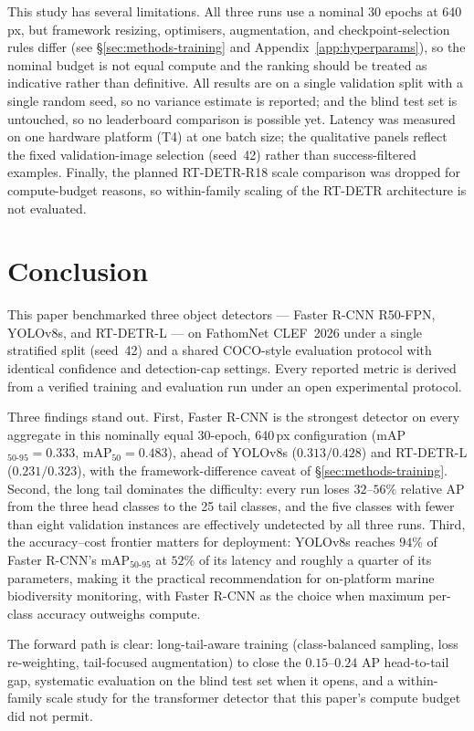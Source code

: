 \documentclass[11pt,a4paper,twocolumn]{article}
\begin{document}
This study has several limitations. All three runs use a nominal 30 epochs at 640\,px, but framework resizing, optimisers, augmentation, and checkpoint-selection rules differ (see \S\ref{sec:methods-training} and Appendix~\ref{app:hyperparams}), so the nominal budget is not equal compute and the ranking should be treated as indicative rather than definitive. All results are on a
single validation split with a single random seed, so no variance
estimate is reported; and the blind test set is untouched, so no
leaderboard comparison is possible yet. Latency was measured on one hardware platform (T4) at one batch size; the qualitative panels reflect the fixed validation-image selection (seed~42) rather than success-filtered examples. Finally, the
planned RT-DETR-R18 scale comparison was dropped for compute-budget
reasons, so within-family scaling of the RT-DETR architecture is not
evaluated.

\section{Conclusion}
\label{sec:conclusion}

This paper benchmarked three object detectors --- Faster R-CNN R50-FPN,
YOLOv8s, and RT-DETR-L --- on FathomNet CLEF~2026 under a single
stratified split (seed~42) and a shared COCO-style evaluation protocol
with identical confidence and detection-cap settings. Every reported
metric is derived from a verified training and evaluation run under an
open experimental protocol.

Three findings stand out. First, Faster R-CNN is the strongest detector on every aggregate in this nominally equal 30-epoch, 640\,px configuration (mAP$_{50\text{-}95}=0.333$, mAP$_{50}=0.483$), ahead of YOLOv8s ($0.313/0.428$) and RT-DETR-L ($0.231/0.323$), with the framework-difference caveat of \S\ref{sec:methods-training}. Second, the long tail dominates the difficulty: every run loses $32$--$56\%$ relative AP from the three head classes to the 25 tail classes, and the five classes with fewer than eight validation instances are effectively undetected by all three runs. Third, the accuracy--cost frontier matters for deployment: YOLOv8s reaches $94\%$ of Faster R-CNN's mAP$_{50\text{-}95}$ at $52\%$ of its latency and roughly a quarter of its parameters, making it the practical recommendation for on-platform marine biodiversity monitoring, with Faster R-CNN as the choice when maximum per-class accuracy outweighs compute.

The forward path is clear: long-tail-aware training (class-balanced
sampling, loss re-weighting, tail-focused augmentation) to close the
$0.15$--$0.24$ AP head-to-tail gap, systematic evaluation on the blind
test set when it opens, and a within-family scale study for the
transformer detector that this paper's compute budget did not permit.
\end{document}
